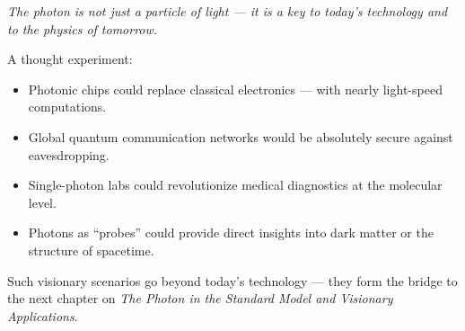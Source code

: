 \medskip
\emph{The photon is not just a particle of light — it is a key to today’s technology and to the physics of tomorrow.}
\vspace{1em}
\begin{tcolorbox}[hypobox, title={What If We Could Fully Control Photons?}]
	\label{box:hypo_kapVII}
	A thought experiment: 
	\begin{itemize}
		\item Photonic chips could replace classical electronics — with nearly light-speed computations.
		\item Global quantum communication networks would be absolutely secure against eavesdropping.
		\item Single-photon labs could revolutionize medical diagnostics at the molecular level.
		\item Photons as “probes” could provide direct insights into dark matter or the structure of spacetime.
	\end{itemize}
	\medskip
	Such visionary scenarios go beyond today’s technology — they form the bridge to the next chapter on \emph{The Photon in the Standard Model and Visionary Applications}.
\end{tcolorbox}



